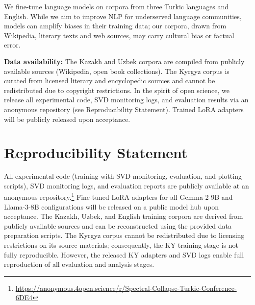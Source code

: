 \documentclass[11pt]{article}
\begin{document}
We fine-tune language models on corpora from three Turkic languages and English. While we aim to improve NLP for underserved language communities, models can amplify biases in their training data; our corpora, drawn from Wikipedia, literary texts and web sources, may carry cultural bias or factual error.

\textbf{Data availability:} The Kazakh and Uzbek corpora are compiled from publicly available sources (Wikipedia, open book collections). The Kyrgyz corpus is curated from licensed literary and encyclopedic sources and cannot be redistributed due to copyright restrictions. In the spirit of open science, we release all experimental code, SVD monitoring logs, and evaluation results via an anonymous repository (see Reproducibility Statement). Trained LoRA adapters will be publicly released upon acceptance.


\section*{Reproducibility Statement}

All experimental code (training with SVD monitoring, evaluation, and plotting scripts), SVD monitoring logs, and evaluation reports are publicly available at an anonymous repository.\footnote{{\small\url{https://anonymous.4open.science/r/Spectral-Collapse-Turkic-Conference-6DE4}}} Fine-tuned LoRA adapters for all Gemma-2-9B and Llama-3-8B configurations will be released on a public model hub upon acceptance. The Kazakh, Uzbek, and English training corpora are derived from publicly available sources and can be reconstructed using the provided data preparation scripts. The Kyrgyz corpus cannot be redistributed due to licensing restrictions on its source materials; consequently, the KY training stage is not fully reproducible. However, the released KY adapters and SVD logs enable full reproduction of all evaluation and analysis stages.


\end{document}
